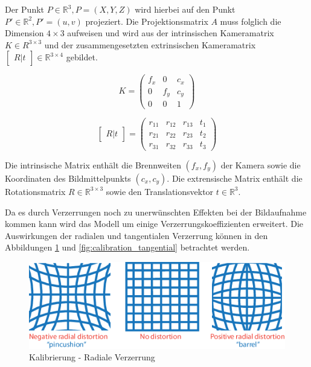 Der Punkt \( P \in \mathbb{R}^3, P = (X, Y, Z) \) wird hierbei auf den Punkt \( P' \in \mathbb{R}^2, P' = (u, v) \) projeziert. Die Projektionsmatrix \( A \) muss folglich die Dimension \(4 \times 3 \) aufweisen und wird aus der intrinsischen Kameramatrix \(K \in {R}^{3 \times 3} \) und der zusammengesetzten extrinsischen Kameramatrix \( \begin{bmatrix}
      R | t
  \end{bmatrix} \in \mathbb{R}^{3 \times 4} \) gebildet.

\begin{multicols}{2}
\centering

\begin{equation}
 K = \begin{pmatrix}
      f_x & 0 & c_x \\
      0 & f_y & c_y \\
      0 & 0 & 1
     \end{pmatrix}
\end{equation}

\columnbreak
\centering
\begin{equation}
  \begin{bmatrix}
      R | t
  \end{bmatrix}
  = 
  \begin{pmatrix}
   r_{11} & r_{12} & r_{13} & t_1 \\
   r_{21} & r_{22} & r_{23} & t_2 \\
   r_{31} & r_{32} & r_{33} & t_3 
  \end{pmatrix}
\end{equation}
\end{multicols}

Die intrinsische Matrix enth\"alt die Brennweiten \( (f_x, f_y) \) der Kamera sowie die Koordinaten des Bildmittelpunkts \( (c_x, c_y) \).
Die extrensische Matrix enth\"alt die Rotationsmatrix \( R \in \mathbb{R}^{3 \times 3} \) sowie den Translationsvektor \( t \in \mathbb{R}^3 \).

Da es durch Verzerrungen noch zu unerw\"unschten Effekten bei der Bildaufnahme kommen kann wird das Modell um einige Verzerrungskoeffizienten erweitert. Die Auswirkungen der radialen und tangentialen Verzerrung k\"onnen in den Abbildungen \ref{fig:calibration_radial} und \ref{fig:calibration_tangential} betrachtet werden. 

\begin{figure}
 \centering
 \includegraphics[width=1\textwidth]{media/calibration/calibration_radial_distortion.png}
 \caption{Kalibrierung - Radiale Verzerrung}
 \label{fig:calibration_radial}
\end{figure}

